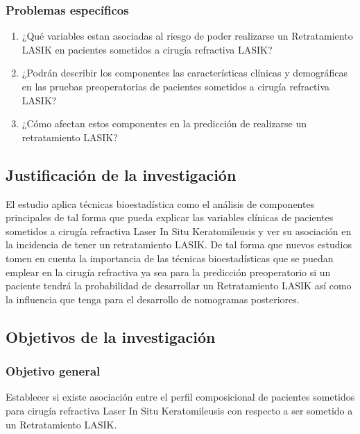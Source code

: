 \subsubsection{Problemas específicos}

\begin{enumerate}

	\item ¿Qué variables estan asociadas al riesgo de poder realizarse un Retratamiento LASIK en pacientes sometidos a cirugía refractiva LASIK?
 
	\item ¿Podrán describir los componentes las características clínicas y demográficas en las pruebas preoperatorias de pacientes sometidos a cirugía refractiva LASIK?

    \item ¿Cómo afectan estos componentes en la predicción de realizarse un retratamiento LASIK?

\end{enumerate}


\subsection{Justificación de la investigación}
El estudio aplica técnicas bioestadística como el análisis de componentes principales de tal forma que pueda explicar las variables clínicas de pacientes sometidos a cirugía refractiva Laser In Situ Keratomileusis y ver su asociación en la incidencia de tener un retratamiento LASIK. De tal forma que nuevos estudios tomen en cuenta la importancia de las técnicas bioestadísticas que se puedan emplear en la cirugía refractiva ya sea para la predicción preoperatorio si un paciente tendrá la probabilidad de desarrollar un Retratamiento LASIK así como la influencia que tenga para el desarrollo de nomogramas posteriores.
 

\subsection{Objetivos de la investigación}

\subsubsection{Objetivo general}
Establecer si existe asociación entre el perfil composicional de pacientes sometidos para cirugía refractiva Laser In Situ Keratomileusis con respecto a ser sometido a un Retratamiento LASIK.


